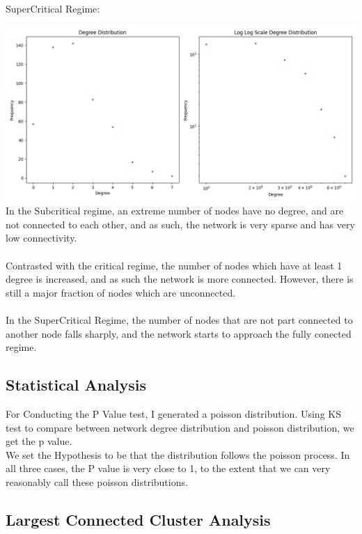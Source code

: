 \documentclass[11pt]{article}
\begin{document}
SuperCritical Regime:

\includegraphics[scale=0.5]{supcgdis.png} \\
In the Subcritical regime, an extreme number of nodes have no degree, and are not connected to each other, and as such, the network is very sparse and has very low connectivity. \\ \\
Contrasted with the critical regime, the number of nodes which have at least 1 degree is increased, and as such the network is more connected. However, there is still a major fraction of nodes which are unconnected.\\ \\
In the SuperCritical Regime, the number of nodes that are not part connected to another node falls sharply, and the network starts to approach the fully conected regime.

\subsection{Statistical Analysis}

For Conducting the P Value test, I generated a poisson distribution. Using KS test to compare between network degree distribution and poisson distribution, we get the p value.\\ 
We set the Hypothesis to be that the distribution follows the poisson process. In all three cases, the P value is very close to 1, to the extent that we can very reasonably call these poisson distributions. \\

\subsection{Largest Connected Cluster Analysis}
\end{document}
